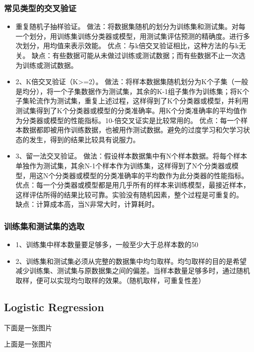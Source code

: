 \documentclass[10pt,a4paper]{ctexbook}
\begin{document}
\subsubsection{常见类型的交叉验证}
\begin{itemize}
\item 重复随机子抽样验证。
    \subitem 做法：将数据集随机的划分为训练集和测试集。对每一个划分，用训练集训练分类器或模型，用测试集评估预测的精确度。进行多次划分，用均值来表示效能。
    \subitem 优点：与k倍交叉验证相比，这种方法的与k无关。
    \subitem 缺点：有些数据可能从未做过训练或测试数据；而有些数据不止一次选为训练或测试数据。
\item 2、K倍交叉验证（K>=2）。
    \subitem 做法：将样本数据集随机划分为K个子集（一般是均分），将一个子集数据作为测试集，其余的K-1组子集作为训练集；将K个子集轮流作为测试集，重复上述过程，这样得到了K个分类器或模型，并利用测试集得到了K个分类器或模型的分类准确率。用K个分类准确率的平均值作为分类器或模型的性能指标。10-倍交叉证实是比较常用的。
    \subitem 优点：每一个样本数据都即被用作训练数据，也被用作测试数据。避免的过度学习和欠学习状态的发生，得到的结果比较具有说服力。
\item 3、留一法交叉验证。
    \subitem 做法：假设样本数据集中有N个样本数据。将每个样本单独作为测试集，其余N-1个样本作为训练集，这样得到了N个分类器或模型，用这N个分类器或模型的分类准确率的平均数作为此分类器的性能指标。
    \subitem 优点：每一个分类器或模型都是用几乎所有的样本来训练模型，最接近样本，这样评估所得的结果比较可靠。实验没有随机因素，整个过程是可重复的。
    \subitem 缺点：计算成本高，当N非常大时，计算耗时。
\end{itemize}

\subsubsection{训练集和测试集的选取}
\begin{itemize}
\item 1、训练集中样本数量要足够多，一般至少大于总样本数的50%
\item 2、训练集和测试集必须从完整的数据集中均匀取样。均匀取样的目的是希望减少训练集、测试集与原数据集之间的偏差。当样本数量足够多时，通过随机取样，便可以实现均匀取样的效果。（随机取样，可重复性差）
\end{itemize}

\subsection{Logistic Regression}

下面是一张图片


上面是一张图片



\ifx\mlbook\undefined
    
\end{document}
